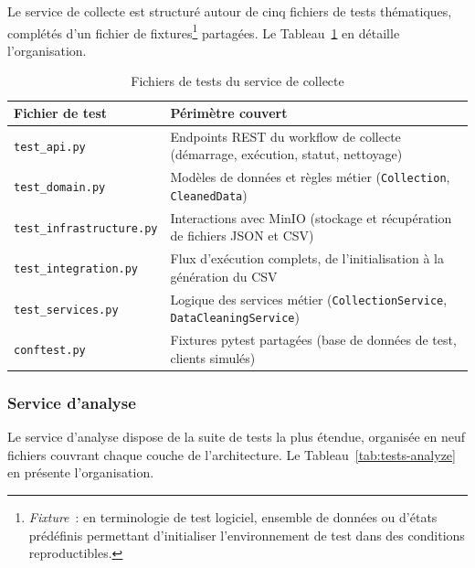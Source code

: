 Le service de collecte est structuré autour de cinq fichiers de tests thématiques, complétés
d'un fichier de fixtures\footnote{\textit{Fixture}~: en terminologie de test logiciel, ensemble
de données ou d'états prédéfinis permettant d'initialiser l'environnement de test dans des
conditions reproductibles.} partagées. Le Tableau~\ref{tab:tests-collection} en détaille
l'organisation.

\begin{table}[H]
\centering
\small
\caption{Fichiers de tests du service de collecte}
\label{tab:tests-collection}
\begin{tabular}{|>{\raggedright\arraybackslash}p{4.5cm}
                |>{\raggedright\arraybackslash}p{8.5cm}|}
\hline
\textbf{Fichier de test} & \textbf{Périmètre couvert} \\
\hline
\texttt{test\_api.py} & Endpoints REST du workflow de collecte (démarrage, exécution, statut, nettoyage) \\
\hline
\texttt{test\_domain.py} & Modèles de données et règles métier (\texttt{Collection}, \texttt{CleanedData}) \\
\hline
\texttt{test\_infrastructure.py} & Interactions avec MinIO (stockage et récupération de fichiers JSON et CSV) \\
\hline
\texttt{test\_integration.py} & Flux d'exécution complets, de l'initialisation à la génération du CSV \\
\hline
\texttt{test\_services.py} & Logique des services métier (\texttt{CollectionService}, \texttt{DataCleaningService}) \\
\hline
\texttt{conftest.py} & Fixtures pytest partagées (base de données de test, clients simulés) \\
\hline
\end{tabular}
\end{table}

\subsubsection*{Service d'analyse}

Le service d'analyse dispose de la suite de tests la plus étendue, organisée en neuf fichiers
couvrant chaque couche de l'architecture. Le Tableau~\ref{tab:tests-analyze} en présente
l'organisation.

